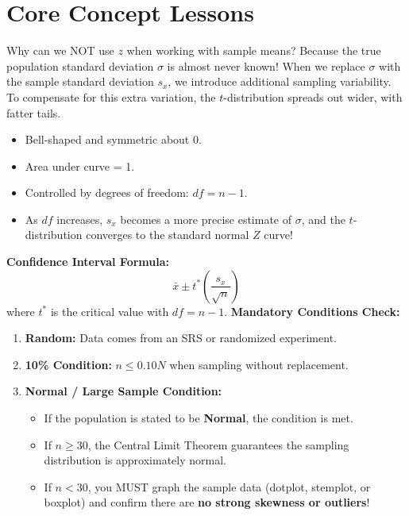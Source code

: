 \section{Core Concept Lessons}

\begin{lessonbox}
Why can we NOT use $z$ when working with sample means?
Because the true population standard deviation $\sigma$ is almost never known! When we replace $\sigma$ with the sample standard deviation $s_x$, we introduce additional sampling variability. To compensate for this extra variation, the $t$-distribution spreads out wider, with fatter tails.
\begin{itemize}[leftmargin=1.2em]
  \item Bell-shaped and symmetric about 0.
  \item Area under curve = 1.
  \item Controlled by degrees of freedom: $df = n - 1$.
  \item As $df$ increases, $s_x$ becomes a more precise estimate of $\sigma$, and the $t$-distribution converges to the standard normal $Z$ curve!
\end{itemize}
\end{lessonbox}

\begin{lessonbox}
\textbf{Confidence Interval Formula:}
\begin{equation}
  \bar{x} \pm t^* \left(\frac{s_x}{\sqrt{n}}\right)
\end{equation}
where $t^*$ is the critical value with $df = n - 1$.
\textbf{Mandatory Conditions Check:}
\begin{enumerate}[leftmargin=1.5em]
  \item \textbf{Random:} Data comes from an SRS or randomized experiment.
  \item \textbf{10\% Condition:} $n \le 0.10N$ when sampling without replacement.
  \item \textbf{Normal / Large Sample Condition:}
  \begin{itemize}
    \item If the population is stated to be \textbf{Normal}, the condition is met.
    \item If $n \ge 30$, the Central Limit Theorem guarantees the sampling distribution is approximately normal.
    \item If $n < 30$, you MUST graph the sample data (dotplot, stemplot, or boxplot) and confirm there are \textbf{no strong skewness or outliers}!
  \end{itemize}
\end{enumerate}
\end{lessonbox}


